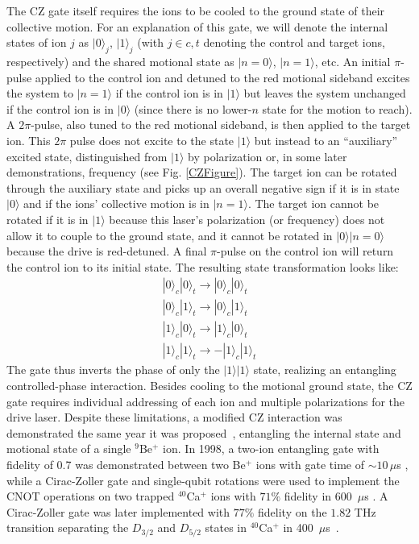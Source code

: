 \documentclass[%
12pt,
 amsmath,amssymb,
]{revtex4-2}
\newcommand{\zero}{|0 \rangle}
\newcommand{\one}{|1 \rangle}
\begin{document}
The CZ gate itself requires the ions to be cooled to the ground state of their collective motion. For an explanation of this gate, we will denote the internal states of ion $j$ as $\zero_j$, $\one_j$ (with $j \in c,t$ denoting the control and target ions, respectively) and the shared motional state as $| n = 0 \rangle$, $| n = 1 \rangle$, etc. An initial $\pi$-pulse applied to the control ion and detuned to the red motional sideband excites the system to $|n = 1 \rangle$ if the control ion is in $\one$ but leaves the system unchanged if the control ion is in $\zero$ (since there is no lower-$n$ state for the motion to reach). A $2 \pi$-pulse, also tuned to the red motional sideband, is then applied to the target ion. This $2 \pi$ pulse does not excite to the state $\one$ but instead to an ``auxiliary'' excited state, distinguished from $\one$ by polarization or, in some later demonstrations, frequency (see Fig. \ref{CZFigure}). The target ion can be rotated through the auxiliary state and picks up an overall negative sign if it is in state $\zero$ and if the ions' collective motion is in $|n = 1 \rangle$. The target ion cannot be rotated if it is in $\one$ because this laser's polarization (or frequency) does not allow it to couple to the ground state, and it cannot be rotated in $\zero |n = 0 \rangle$ because the drive is red-detuned. A final $\pi$-pulse on the control ion will return the control ion to its initial state. The resulting state transformation looks like:
%
\begin{eqnarray}
\zero_c \zero_t \rightarrow \zero_c \zero_t \\
\zero_c \one_t \rightarrow \zero_c \one_t \\
\one_c \zero_t \rightarrow \one_c \zero_t \\
\one_c \one_t \rightarrow - \one_c \one_t
\end{eqnarray}
%
The gate thus inverts the phase of only the $\one \one$ state, realizing an entangling controlled-phase interaction. Besides cooling to the motional ground state, the CZ gate requires individual addressing of each ion and multiple polarizations for the drive laser. Despite these limitations, a modified CZ interaction was demonstrated the same year it was proposed~\cite{MonroeCNOT1995}, entangling the internal state and motional state of a single $^9$Be$^+$ ion. In 1998, a two-ion entangling gate with fidelity of 0.7 was demonstrated between two Be$^+$ ions with gate time of $\sim 10 \, \mu$s \cite{TurchetteEntanglement1998}, while a Cirac-Zoller gate and single-qubit rotations were used to implement the CNOT operations on two trapped $^{40}$Ca$^+$ ions with $71 \%$ fidelity in $600$~$\mu$s \cite{SchmidtKalerCNOT2003}. A Cirac-Zoller gate was later implemented with $77 \%$ fidelity on the $1.82$ THz transition separating the $D_{3/2}$ and $D_{5/2}$ states in $^{40}$Ca$^+$ in 400~$\mu$s~\cite{PhysRevA.81.032322}.
\end{document}
